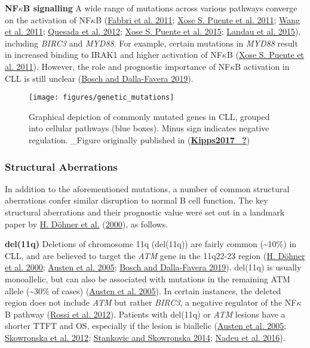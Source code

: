 \documentclass[11pt, a4paper, twosided]{book}
\begin{document}
\textbf{NF\(\kappa\)B signalling}
A wide range of mutations across various pathways converge on the activation of NF\(\kappa\)B (\protect\hyperlink{ref-Fabbri2011}{Fabbri et al. 2011}; \protect\hyperlink{ref-Puente2011}{Xose S. Puente et al. 2011}; \protect\hyperlink{ref-Wang2011}{Wang et al. 2011}; \protect\hyperlink{ref-Quesada2012}{Quesada et al. 2012}; \protect\hyperlink{ref-Puente2015}{Xose S. Puente et al. 2015}; \protect\hyperlink{ref-Landau2015}{Landau et al. 2015}), including \emph{BIRC3} and \emph{MYD88}. For example, certain mutations in \emph{MYD88} result in increased binding to IRAK1 and higher activation of NF\(\kappa\)B (\protect\hyperlink{ref-Puente2011}{Xose S. Puente et al. 2011}). However, the role and prognostic importance of NF\(\kappa\)B activation in CLL is still unclear (\protect\hyperlink{ref-Bosch2019}{Bosch and Dalla-Favera 2019}).


\begin{figure}

{\centering \texttt{[image: figures/genetic\_mutations]} 

}

\caption{Graphical depiction of commonly mutated genes in CLL, grouped into cellular pathways (blue boxes). Minus sign indicates negative regulation. \_Figure originally published in (\protect\hyperlink{ref-Kipps2017_}{\textbf{Kipps2017\_?}})}\label{fig:CLLmutations}
\end{figure}
\hypertarget{intro-structural-abberations}{%
\subsubsection{Structural Aberrations}\label{intro-structural-abberations}}

In addition to the aforementioned mutations, a number of common structural aberrations confer similar disruption to normal B cell function. The key structural aberrations and their prognostic value were set out in a landmark paper by \protect\hyperlink{ref-Dohner2000}{H. Döhner et al.} (\protect\hyperlink{ref-Dohner2000}{2000}), as follows.

\textbf{del(11q)}
Deletions of chromosome 11q (del(11q)) are fairly common (\textasciitilde10\%) in CLL, and are believed to target the \emph{ATM} gene in the 11q22-23 region (\protect\hyperlink{ref-Dohner2000}{H. Döhner et al. 2000}; \protect\hyperlink{ref-Austen2005}{Austen et al. 2005}; \protect\hyperlink{ref-Bosch2019}{Bosch and Dalla-Favera 2019}). del(11q) is usually monoallelic, but can also be associated with mutations in the remaining ATM allele (\textasciitilde30\% of cases) (\protect\hyperlink{ref-Austen2005}{Austen et al. 2005}). In certain instances, the deleted region does not include \emph{ATM} but rather \emph{BIRC3}, a negative regulator of the NF\(\kappa\)B pathway (\protect\hyperlink{ref-Rossi2012}{Rossi et al. 2012}). Patients with del(11q) or \emph{ATM} lesions have a shorter TTFT and OS, especially if the lesion is biallelic (\protect\hyperlink{ref-Austen2005}{Austen et al. 2005}; \protect\hyperlink{ref-Skowronska2012}{Skowronska et al. 2012}; \protect\hyperlink{ref-Stankovic2014}{Stankovic and Skowronska 2014}; \protect\hyperlink{ref-Nadeu2016}{Nadeu et al. 2016}).
\end{document}
